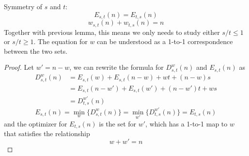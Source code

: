 \documentclass[]{article}
\begin{document}
\vspace{1cm}
\begin{lemma}[Symmetry] Symmetry of $s$ and $t$:
	\[
		E_{s,t}(n) = E_{t,s}(n)
	\]
	\[
		w_{s,t}(n) + w_{t,s}(n) = n
	\]
Together with previous lemma, this means we only needs to study either $s/t \le1$ or $s/t \ge 1$.  The equation for $w$ can be understood as a 1-to-1 correspondence between the two sets.
\end{lemma}
\begin{proof}
	Let $w' = n - w$, we can rewrite the formula for $D^w_{s,t}(n)$ and $E_{s,t}(n)$ as
	\begin{align*}
	D^w_{s,t}(n) &= E_{s,t}(w) + E_{s,t}(n-w) + wt +(n-w)s\\
	&= E_{s,t}(n-w') + E_{s,t}(w') + (n-w')t +ws\\
	&=D^{w'}_{t,s}(n)
	\end{align*}
	\[
	E_{s,t}(n) = \min_w\{D^w_{s,t}(n)\} = \min_{w'}\{D^{w'}_{t,s}(n)\} = E_{t,s}(n)
	\]
	and the optimizer for $E_{t,s}(n)$ is the set for $w'$, which has a 1-to-1 map to $w$ that satisfies the relationship
	\[
	w + w' = n
	\]
\end{proof}	
\end{document}
